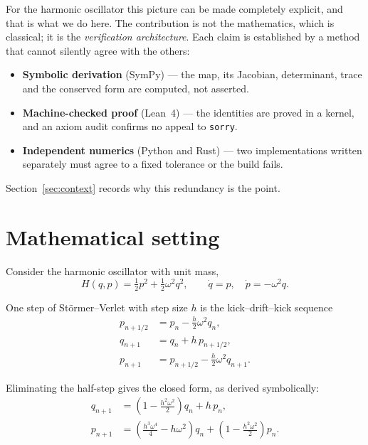 \documentclass[11pt,a4paper]{article}
\begin{document}
For the harmonic oscillator this picture can be made completely explicit, and
that is what we do here. The contribution is not the mathematics, which is
classical; it is the \emph{verification architecture}. Each claim is established
by a method that cannot silently agree with the others:

\begin{itemize}
  \item \textbf{Symbolic derivation} (SymPy) --- the map, its Jacobian,
        determinant, trace and the conserved form are computed, not asserted.
  \item \textbf{Machine-checked proof} (Lean~4) --- the identities are proved in
        a kernel, and an axiom audit confirms no appeal to \texttt{sorry}.
  \item \textbf{Independent numerics} (Python and Rust) --- two implementations
        written separately must agree to a fixed tolerance or the build fails.
\end{itemize}

Section~\ref{sec:context} records why this redundancy is the point.

\section{Mathematical setting}

Consider the harmonic oscillator with unit mass,
\begin{equation}
  H(q,p) = \tfrac12 p^2 + \tfrac12\omega^2 q^2,
  \qquad \dot q = p, \quad \dot p = -\omega^2 q .
\end{equation}

One step of St\"ormer--Verlet with step size $h$ is the kick--drift--kick sequence
\begin{align}
  p_{n+1/2} &= p_n - \tfrac{h}{2}\omega^2 q_n, \\
  q_{n+1}   &= q_n + h\,p_{n+1/2}, \\
  p_{n+1}   &= p_{n+1/2} - \tfrac{h}{2}\omega^2 q_{n+1} .
\end{align}

Eliminating the half-step gives the closed form, as derived symbolically:
\begin{align}
  q_{n+1} &= \left(1-\tfrac{h^2\omega^2}{2}\right)q_n + h\,p_n, \\
  p_{n+1} &= \left(\tfrac{h^3\omega^4}{4}-h\omega^2\right)q_n
             + \left(1-\tfrac{h^2\omega^2}{2}\right)p_n .
\end{align}
\end{document}
